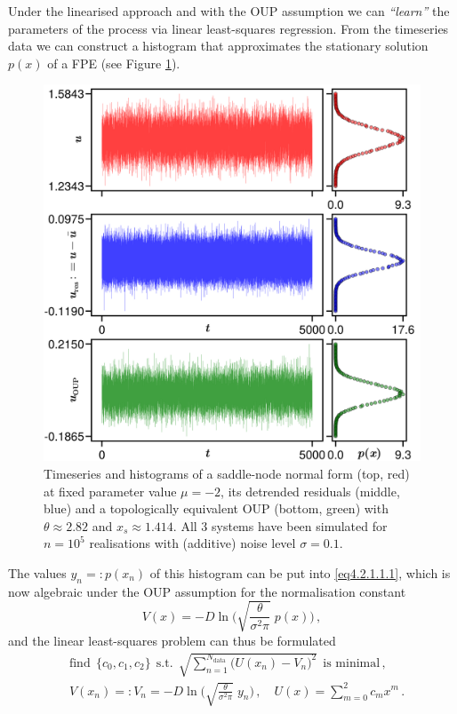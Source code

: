 \documentclass[../main.tex]{subfiles}
\begin{document}
Under the linearised approach and with the OUP assumption we can \textit{``learn''} the parameters of the process via linear least-squares regression.
From the timeseries data we can construct a histogram that approximates the stationary solution $p(x)$ of a FPE (see Figure \ref{fig4.2.1.1.1}).
\begin{figure}[H]
    \centering 
    \includegraphics[keepaspectratio, width=\textwidth]{../figures/fig4.2.1.1.1.png}
    \caption{Timeseries and histograms of a saddle-node normal form (top, red) at fixed parameter value $\mu=-2$, its detrended residuals (middle, blue) and a topologically equivalent OUP (bottom, green) with $\theta\approx2.82$ and $x_{s}\approx1.414$. All $3$ systems have been simulated for $n=10^{5}$ realisations with (additive) noise level $\sigma=0.1$.}
    \label{fig4.2.1.1.1}
\end{figure}
The values $y_{n} =: p(x_{n})$ of this histogram can be put into \eqref{eq4.2.1.1.1}, which is now algebraic under the OUP assumption for the normalisation constant
\begin{equation}\label{eq2.4.1.1.2}
     V(x) = -D\ln\bigg(\sqrt{\frac{\theta}{\sigma^{2}\pi}}\;p(x)\bigg)\,,
\end{equation}
and the linear least-squares problem can thus be formulated
\begin{align}
     &\text{find}\;\,\{c_{0},c_{1},c_{2}\}\;\,\text{s.t.}\;\,\sqrt{\sum_{n=1}^{N_{\text{data}}}\big(U(x_{n}) - V_{n}\big)^{2}}\;\,\text{is minimal}\,, \label{eq4.2.1.1.3} \\ 
     &V(x_{n}) =: V_{n} = -D\ln\bigg(\sqrt{\frac{\theta}{\sigma^{2}\pi}}\;y_{n}\bigg)\,,\quad U(x)=\sum_{m=0}^{2}c_{m}x^{m}\,.\nonumber
\end{align}
\end{document}
